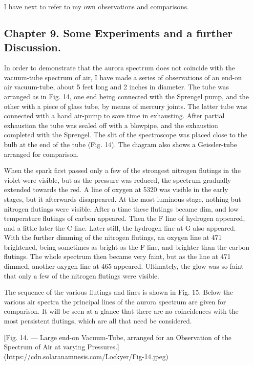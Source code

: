 \documentclass[a4paper, 12pt, oneside, polutonikogreek, english]{article}
\begin{document}
I have next to refer to my own observations and comparisons.

\subsection{Chapter 9. Some Experiments and a further Discussion.}

In order to demonstrate that the aurora spectrum does not coincide with the vacuum-tube spectrum of air, I have made a series of observations of an end-on air vacuum-tube, about 5 feet long and 2 inches in diameter. The tube was arranged as in Fig. 14, one end being connected with the Sprengel pump, and the other with a piece of glass tube, by means of mercury joints. The latter tube was connected with a hand air-pump to save time in exhausting. After partial exhaustion the tube was sealed off with a blowpipe, and the exhaustion completed with the Sprengel. The slit of the spectroscope was placed close to the bulb at the end of the tube (Fig. 14). The diagram also shows a Geissler-tube arranged for comparison.

When the spark first passed only a few of the strongest nitrogen flutings in the violet were visible, but as the pressure was reduced, the spectrum gradually extended towards the red. A line of oxygen at 5320 was visible in the early stages, but it afterwards disappeared. At the most luminous stage, nothing but nitrogen flutings were visible. After a time these flutings became dim, and low temperature flutings of carbon appeared. Then the F line of hydrogen appeared, and a little later the C line. Later still, the hydrogen line at G also appeared. With the further dimming of the nitrogen flutings, an oxygen line at 471 brightened, being sometimes as bright as the F line, and brighter than the carbon flutings. The whole spectrum then became very faint, but as the line at 471 dimmed, another oxygen line at 465 appeared. Ultimately, the glow was so faint that only a few of the nitrogen flutings were visible.

The sequence of the various flutings and lines is shown in Fig. 15. Below the various air spectra the principal lines of the aurora spectrum are given for comparison. It will be seen at a glance that there are no coincidences with the most persistent flutings, which are all that need be considered.

[Fig. 14. --- Large end-on Vacuum-Tube, arranged for an Observation of the Spectrum of Air at varying Pressures.](https://cdn.solaranamnesis.com/Lockyer/Fig-14.jpeg)
\end{document}

